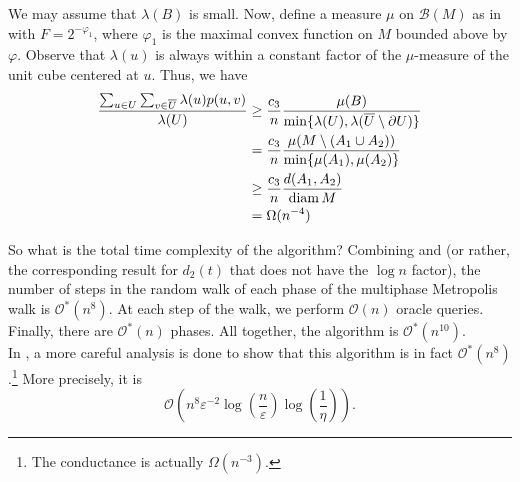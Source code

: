 We may assume that $\lambda(B)$ is small.
Now, define a measure $\mu$ on $\mathcal{B}(M)$ as in  with $F=2^{-\varphi_1}$, where $\varphi_1$ is the maximal convex function on $M$ bounded above by $\varphi$. Observe that $\lambda(u)$ is always within a constant factor of the $\mu$-measure of the unit cube centered at $u$. Thus, we have
\begin{align}
    \frac{\sum_{u\in U} \sum_{v\in\overline{U}} \lambda(u)p(u,v)}{\lambda(U)} &\geq \frac{c_3}{n}\frac{\mu(B)}{\min\{\lambda(U),\lambda(\overline{U}\setminus\partial U)\}} \nonumber \\
    &= \frac{c_3}{n}\frac{\mu(M \setminus (A_1\cup A_2))}{\min\{\mu(A_1),\mu(A_2)\}} \nonumber \\
    &\geq \frac{c_3}{n} \frac{d(A_1,A_2)}{\operatorname{diam} M} \nonumber \\
    &= \Omega(n^{-4}) \label{eqn: number of steps}
\end{align}

So what is the total time complexity of the algorithm? Combining  and  (or rather, the corresponding result for $d_2(t)$ that does not have the $\log n$ factor), the number of steps in the random walk of each phase of the multiphase Metropolis walk is $\mathcal{O}^*(n^{8})$. At each step of the walk, we perform $\mathcal{O}(n)$ oracle queries. Finally, there are $\mathcal{O}^*(n)$ phases. All together, the algorithm is $\mathcal{O}^*(n^{10})$.\\

In \cite{dyer-frieze-sample-outside}, a more careful analysis is done to show that this algorithm is in fact $\mathcal{O}^*(n^{8})$.\footnote{The conductance is actually $\Omega(n^{-3})$.} More precisely, it is
\[ \mathcal{O}\left(n^8\varepsilon^{-2}\log\left(\frac{n}{\varepsilon}\right)\log\left(\frac{1}{\eta}\right)\right). \]


